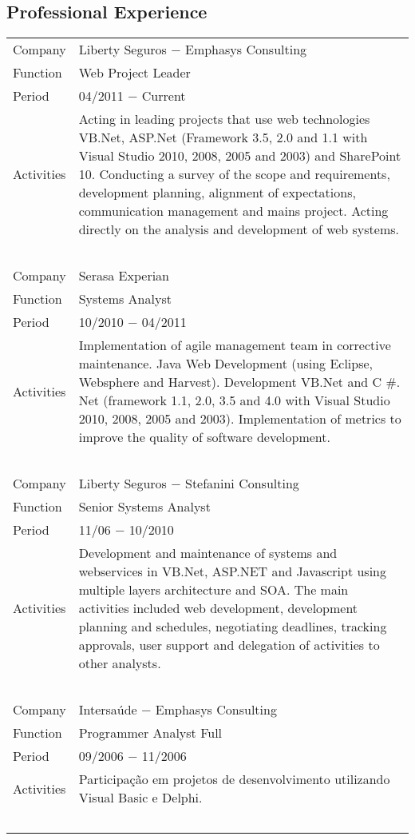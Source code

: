 \documentclass[a4paper, oneside, final]{scrartcl}
\begin{document}
\begin{center}
\section{Professional Experience}

\begin{tabularx}{0.97\linewidth}{p{2cm}X}

Company     & Liberty Seguros $-$ Emphasys Consulting \\
Function    & Web Project Leader\\
Period      & 04/2011 $-$ Current \\
Activities  & Acting in leading projects that use web technologies VB.Net, ASP.Net (Framework 3.5, 2.0 and 1.1 with Visual Studio 2010, 2008, 2005 and 2003) and SharePoint 10. Conducting a survey of the scope and requirements, development planning, alignment of expectations, communication management and mains project. Acting directly on the analysis and development of web systems. \\
            & \ \\

Company     & Serasa Experian\\
Function    & Systems Analyst\\
Period      & 10/2010 $-$ 04/2011\\
Activities  & Implementation of agile management team in corrective maintenance. Java Web Development (using Eclipse, Websphere and Harvest). Development VB.Net and C \#. Net (framework 1.1, 2.0, 3.5 and 4.0 with Visual Studio 2010, 2008, 2005 and 2003). Implementation of metrics to improve the quality of software development. \\
            & \ \\

Company     & Liberty Seguros $-$ Stefanini Consulting \\
Function    & Senior Systems Analyst \\
Period      & 11/06 $-$ 10/2010 \\
Activities  & Development and maintenance of systems and webservices in VB.Net, ASP.NET and Javascript using multiple layers architecture and SOA. The main activities included web development, development planning and schedules, negotiating deadlines, tracking approvals, user support and delegation of activities to other analysts. \\
            & \ \\

Company     & Intersaúde $-$ Emphasys Consulting \\
Function    & Programmer Analyst Full \\
Period      & 09/2006 $-$ 11/2006  \\
Activities  & Participação em projetos de desenvolvimento utilizando Visual Basic e Delphi. \\ 
            & \ \\


\end{tabularx}
\end{center}
\end{document}
